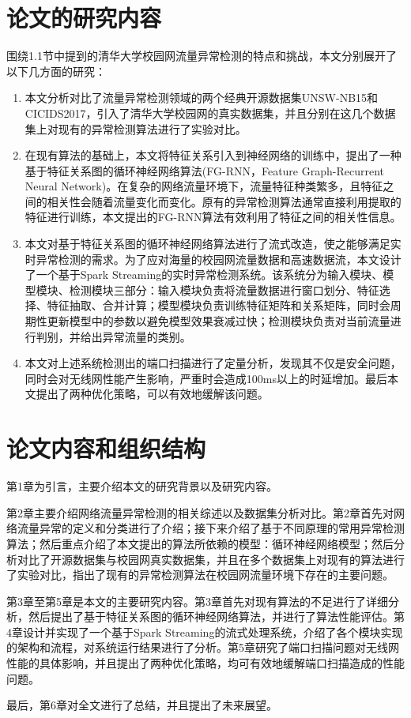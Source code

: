 \section{论文的研究内容}
围绕1.1节中提到的清华大学校园网流量异常检测的特点和挑战，本文分别展开了以下几方面的研究：
\begin{enumerate}
  \item 本文分析对比了流量异常检测领域的两个经典开源数据集UNSW-NB15和CICIDS2017，引入了清华大学校园网的真实数据集，并且分别在这几个数据集上对现有的异常检测算法进行了实验对比。
  \item 在现有算法的基础上，本文将特征关系引入到神经网络的训练中，提出了一种基于特征关系图的循环神经网络算法(FG-RNN，Feature Graph-Recurrent Neural Network)。在复杂的网络流量环境下，流量特征种类繁多，且特征之间的相关性会随着流量变化而变化。原有的异常检测算法通常直接利用提取的特征进行训练，本文提出的FG-RNN算法有效利用了特征之间的相关性信息。
  \item 本文对基于特征关系图的循环神经网络算法进行了流式改造，使之能够满足实时异常检测的需求。为了应对海量的校园网流量数据和高速数据流，本文设计了一个基于Spark Streaming的实时异常检测系统。该系统分为输入模块、模型模块、检测模块三部分：输入模块负责将流量数据进行窗口划分、特征选择、特征抽取、合并计算；模型模块负责训练特征矩阵和关系矩阵，同时会周期性更新模型中的参数以避免模型效果衰减过快；检测模块负责对当前流量进行判别，并给出异常流量的类别。
  \item 本文对上述系统检测出的端口扫描进行了定量分析，发现其不仅是安全问题，同时会对无线网性能产生影响，严重时会造成100ms以上的时延增加。最后本文提出了两种优化策略，可以有效地缓解该问题。

\end{enumerate}

\section{论文内容和组织结构}
第1章为引言，主要介绍本文的研究背景以及研究内容。

第2章主要介绍网络流量异常检测的相关综述以及数据集分析对比。第2章首先对网络流量异常的定义和分类进行了介绍；接下来介绍了基于不同原理的常用异常检测算法；然后重点介绍了本文提出的算法所依赖的模型：循环神经网络模型；然后分析对比了开源数据集与校园网真实数据集，并且在多个数据集上对现有的算法进行了实验对比，指出了现有的异常检测算法在校园网流量环境下存在的主要问题。

第3章至第5章是本文的主要研究内容。第3章首先对现有算法的不足进行了详细分析，然后提出了基于特征关系图的循环神经网络算法，并进行了算法性能评估。第4章设计并实现了一个基于Spark Streaming的流式处理系统，介绍了各个模块实现的架构和流程，对系统运行结果进行了分析。第5章研究了端口扫描问题对无线网性能的具体影响，并且提出了两种优化策略，均可有效地缓解端口扫描造成的性能问题。

最后，第6章对全文进行了总结，并且提出了未来展望。

